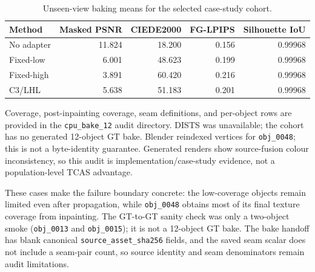 \documentclass[10pt]{article}
\begin{document}
\begin{table}[h]
\centering\small
\caption{Unseen-view baking means for the selected case-study cohort.}
\begin{tabular}{lrrrr}
\toprule
Method & Masked PSNR & CIEDE2000 & FG-LPIPS & Silhouette IoU \\
\midrule
No adapter & 11.824 & 18.200 & 0.156 & 0.99968 \\
Fixed-low & 6.001 & 48.623 & 0.199 & 0.99968 \\
Fixed-high & 3.891 & 60.420 & 0.216 & 0.99968 \\
C3/LHL & 5.638 & 51.183 & 0.201 & 0.99968 \\
\bottomrule
\end{tabular}
\end{table}

Coverage, post-inpainting coverage, seam definitions, and per-object rows are
provided in the \texttt{cpu\_bake\_12} audit directory. DISTS was
unavailable; the cohort has no generated 12-object GT bake. Blender reindexed
vertices for \texttt{obj\_0048}; this is not a byte-identity guarantee.
Generated renders show source-fusion colour inconsistency, so this audit is
implementation/case-study evidence, not a population-level TCAS advantage.

\begin{table}[h]
\centering\scriptsize
\caption{Concrete object-level baking failure boundaries. Values are
object means over 11 unseen views; paired entries are fixed-low/C3.}
\end{table}

These cases make the failure boundary concrete: the low-coverage objects
remain limited even after propagation, while \texttt{obj\_0048} obtains most
of its final texture coverage from inpainting. The GT-to-GT sanity check was
only a two-object smoke (\texttt{obj\_0013} and \texttt{obj\_0015}); it is not
a 12-object GT bake. The bake handoff has blank canonical
\texttt{source\_asset\_sha256} fields, and the saved seam scalar does not
include a seam-pair count, so source identity and seam denominators remain
audit limitations.
\end{document}
